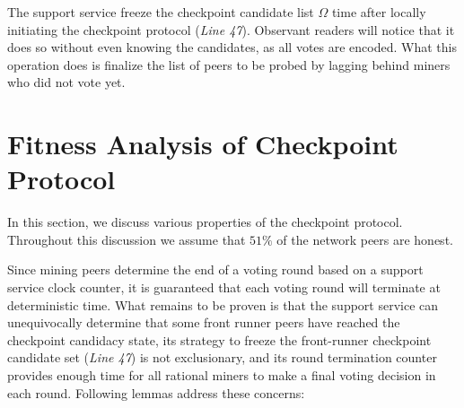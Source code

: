 \documentclass[conference]{IEEEtran}
\begin{document}
The support service freeze the checkpoint candidate list $\Omega$ time after locally initiating the checkpoint protocol (\textit{Line 47}). Observant readers will notice that it does so without even knowing the candidates, as all votes are encoded. What this operation does is finalize the list of peers to be probed by lagging behind miners who did not vote yet.    
        
\section{Fitness Analysis of Checkpoint Protocol}
\label{s-analysis}
In this section, we discuss various properties of the checkpoint protocol. Throughout this discussion we assume that $51\%$ of the network peers are honest.

Since mining peers determine the end of a voting round based on a support service clock counter, it is guaranteed that each voting round will terminate at deterministic time. What remains to be proven is that the support service can unequivocally determine that some front runner peers have reached the checkpoint candidacy state, its strategy to freeze the front-runner checkpoint candidate set (\textit{Line 47}) is not exclusionary, and its round termination counter provides enough time for all rational miners to make a final voting decision in each round. Following lemmas address these concerns:     
\end{document}
